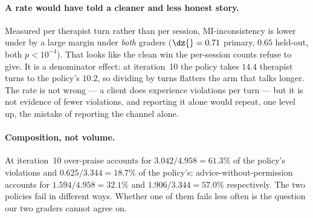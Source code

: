 \paragraph{A rate would have told a cleaner and less honest story.} Measured per therapist turn
rather than per session, MI-inconsistency is lower under \Kf{} by a large margin under
\emph{both} graders ($\dz{}=0.71$ primary, $0.65$ held-out, both $p<10^{-4}$). That looks like the
clean win the per-session counts refuse to give. It is a denominator effect: at iteration~10 the
\Kf{} policy takes $14.4$ therapist turns to the \Kz{} policy's $10.2$, so dividing by turns
flatters the arm that talks longer. The rate is not wrong --- a client does experience violations
per turn --- but it is not evidence of fewer violations, and reporting it alone would repeat, one
level up, the mistake of reporting the channel alone.

\paragraph{Composition, not volume.} At iteration~10 over-praise accounts for
$3.042/4.958 = 61.3\%$ of the \Kz{} policy's violations and $0.625/3.344 = 18.7\%$ of the
\Kf{} policy's; advice-without-permission accounts for $1.594/4.958 = 32.1\%$ and
$1.906/3.344 = 57.0\%$ respectively. The two policies fail in different ways. Whether one of them
fails less often is the question our two graders cannot agree on.
